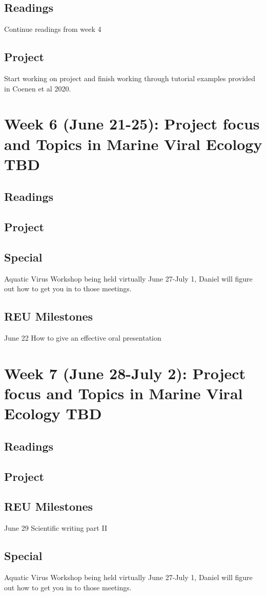 \documentclass[11pt]{amsart}
\begin{document}
\subsection{Readings} Continue readings from week 4
\subsection{Project} Start working on project and finish working through tutorial examples provided in Coenen et al 2020. 
\section{Week 6 (June 21-25): Project focus and Topics in Marine Viral Ecology TBD}
\subsection{Readings}
\subsection{Project}
\subsection{Special} Aquatic Virus Workshop being held virtually June 27-July 1, Daniel will figure out how to get you in to those meetings. 
\subsection{REU Milestones} June 22 How to give an effective oral presentation
\section{Week 7 (June 28-July 2): Project focus and Topics in Marine Viral Ecology TBD}
\subsection{Readings}
\subsection{Project}
\subsection{REU Milestones} June 29 Scientific writing part II
\subsection{Special} Aquatic Virus Workshop being held virtually June 27-July 1, Daniel will figure out how to get you in to those meetings. 
\end{document}
